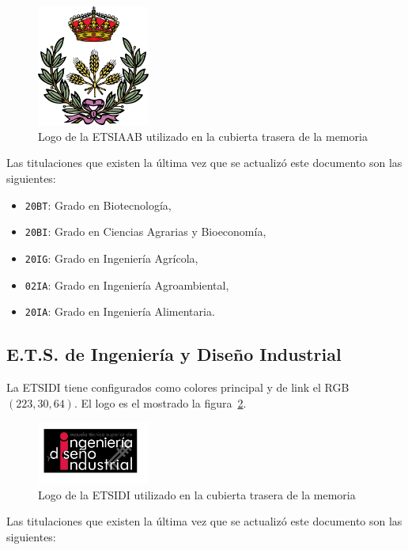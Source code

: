 \begin{figure}[ht]
    \centering
    \includegraphics[width=10em]{upm-report/logos/logo-etsiaab}
    \caption{\label{fig:logo-etsiaab}Logo de la ETSIAAB utilizado en la cubierta trasera de la memoria}
\end{figure}

Las titulaciones que existen la última vez que se actualizó este documento son las siguientes:

\begin{itemize}
    \item \texttt{20BT}: Grado en Biotecnología,
    \item \texttt{20BI}: Grado en Ciencias Agrarias y Bioeconomía,
    \item \texttt{20IG}: Grado en Ingeniería Agrícola,
    \item \texttt{02IA}: Grado en Ingeniería Agroambiental,
    \item \texttt{20IA}: Grado en Ingeniería Alimentaria.
\end{itemize}

\subsection{E.T.S. de Ingeniería y Diseño Industrial}

La ETSIDI tiene configurados como colores principal y de link el RGB $(223,30,64)$. El logo es el mostrado la figura~\ref{fig:logo-etsidi}.

\begin{figure}[ht]
    \centering
    \includegraphics[width=10em]{upm-report/logos/logo-etsidi}
    \caption{\label{fig:logo-etsidi}Logo de la ETSIDI utilizado en la cubierta trasera de la memoria}
\end{figure}

Las titulaciones que existen la última vez que se actualizó este documento son las siguientes:

